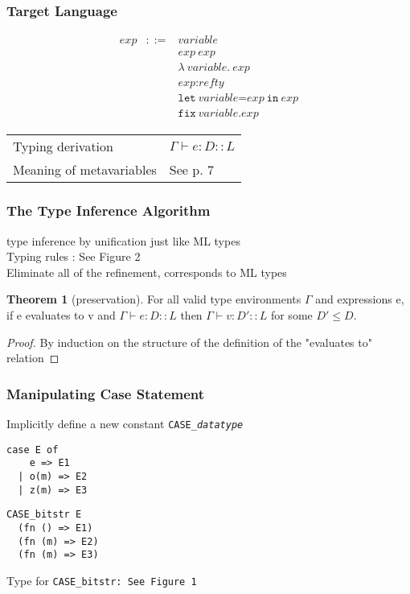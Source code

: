 \documentclass[dvipdfmx,cjk,xcolor=dvipsnames,envcountsect,notheorems,aspectratio=169]{beamer}
\theoremstyle{definition}
\newtheorem{theorem}{Theorem}
\begin{document}
\begin{frame}
	\frametitle{Target Language}
	\[
		\begin{array}{lcl}
			\textit{exp} & ::= & \textit{variable} \\
							& & \textit{exp}~\textit{exp} \\
							& & \lambda~\textit{variable}.~\textit{exp} \\
							& & \textit{exp} : \textit{refty} \\
							& & \texttt{let}~\textit{variable} = \textit{exp}~\texttt{in}~\textit{exp} \\
							& & \texttt{fix}~\textit{variable}. \textit{exp}
		\end{array}
	\]
	{\Large
		\begin{tabular}{ll}
			Typing derivation & $\Gamma \vdash e : D :: L$ \\
			Meaning of metavariables & See p. 7
		\end{tabular}}
\end{frame}

\begin{frame}
	\frametitle{The Type Inference Algorithm}
	{\Large type inference by unification just like ML types \\
	Typing rules : See Figure 2\\
	Eliminate all of the refinement, corresponds to ML types}
	\begin{theorem}[preservation]
		For all valid type environments $\Gamma$ and expressions e, if e evaluates to v and $\Gamma \vdash e : D :: L$ then $\Gamma \vdash v : D' :: L$ for some $D' \leq D$.
	\end{theorem}
	\begin{proof}
		By induction on the structure of the definition of the "evaluates to" relation
	\end{proof}
\end{frame}

\begin{appendix}
	\begin{frame}[fragile]
		\frametitle{Manipulating Case Statement}
		\Large Implicitly define a new constant \tt{CASE}\_\it{datatype}
\begin{lstlisting}
case E of
    e => E1
  | o(m) => E2
  | z(m) => E3
\end{lstlisting}
\begin{lstlisting}
CASE_bitstr E
  (fn () => E1)
  (fn (m) => E2)
  (fn (m) => E3)
\end{lstlisting}
		Type for \tt{CASE\_bitstr}: See Figure 1
	\end{frame}
\end{appendix}
\end{document}
